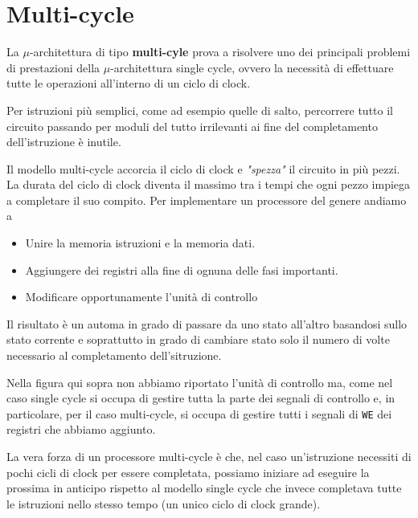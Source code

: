 \section{Multi-cycle}
La $\mu$-architettura di tipo \textbf{multi-cyle} prova a risolvere uno dei principali problemi di
prestazioni della $\mu$-architettura single cycle, ovvero la necessità di effettuare tutte le
operazioni all'interno di un ciclo di clock.

Per istruzioni più semplici, come ad esempio quelle di salto, percorrere tutto il circuito passando
per moduli del tutto irrilevanti ai fine del completamento dell'istruzione è inutile.

Il modello multi-cycle accorcia il ciclo di clock e \emph{"spezza"} il circuito in più pezzi. La
durata del ciclo di clock diventa il massimo tra i tempi che ogni pezzo impiega a completare il suo
compito. Per implementare un processore del genere andiamo a
\begin{itemize}
	\item Unire la memoria istruzioni e la memoria dati.
	\item Aggiungere dei registri alla fine di ognuna delle fasi importanti.
	\item Modificare opportunamente l'unità di controllo
\end{itemize}
Il risultato è un automa in grado di passare da uno stato all'altro basandosi sullo stato corrente
e soprattutto in grado di cambiare stato solo il numero di volte necessario al completamento
dell'sitruzione.
\begin{center}
	
\end{center}
Nella figura qui sopra non abbiamo riportato l'unità di controllo ma, come nel caso single cycle
si occupa di gestire tutta la parte dei segnali di controllo e, in particolare, per il caso
multi-cycle, si occupa di gestire tutti i segnali di \verb|WE| dei registri che abbiamo aggiunto.

La vera forza di un processore multi-cycle è che, nel caso un'istruzione necessiti di pochi cicli
di clock per essere completata, possiamo iniziare ad eseguire la prossima in anticipo rispetto al
modello single cycle che invece completava tutte le istruzioni nello stesso tempo (un unico ciclo
di clock grande).